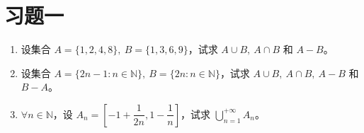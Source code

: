 \documentclass[UTF8,12pt,a4paper,fontset=fandol]{ctexbook}
\begin{document}
\section*{习题一}

\begin{enumerate}
  \item 设集合 $A=\{1,2,4,8\},\ B=\{1,3,6,9\}$，试求 $A\cup B,\ A\cap B$ 和 $A-B$。
  \item 设集合 $A=\{2n-1:n\in\mathbb{N}\},\ B=\{2n:n\in\mathbb{N}\}$，试求 $A\cup B,\ A\cap B,\ A-B$ 和 $B-A$。
  \item $\forall n\in\mathbb{N}$，设 $A_n=\left[-1+\dfrac{1}{2n},1-\dfrac1n\right]$，试求 $\displaystyle\bigcup_{n=1}^{+\infty}A_n$。
\end{enumerate}
\end{document}

